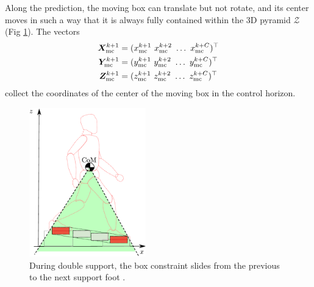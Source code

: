 Along the prediction, the moving box can translate but not rotate, and its
center moves in such a way that it is always
fully contained within the 3D pyramid $\mathcal{Z}$
(Fig \ref{fig:SYROCO18-double-support3D}).
The vectors
\begin{align*}
    \bm{X}_{\rm mc}^{k+1} &= (x_{\rm mc}^{k+1} \ x_{\rm mc}^{k+2} \ \dots \ x_{\rm mc}^{k+C})^\top \\
    \bm{Y}_{\rm mc}^{k+1} &= (y_{\rm mc}^{k+1} \ y_{\rm mc}^{k+2} \ \dots \ y_{\rm mc}^{k+C})^\top \\
    \bm{Z}_{\rm mc}^{k+1} &= (z_{\rm mc}^{k+1} \ z_{\rm mc}^{k+2} \ \dots \ z_{\rm mc}^{k+C})^\top
\end{align*}
collect the coordinates of the center of the moving box in the control horizon.
\begin{figure}
    \centering
    \includegraphics[width=0.45\textwidth]{figures/SYROCO18-double-support3D.pdf}
    \caption{During double support, the box constraint slides from the
        previous to the next support foot \cite{Zamparelli2018SYROCO}.}
    \label{fig:SYROCO18-double-support3D}
\end{figure}

